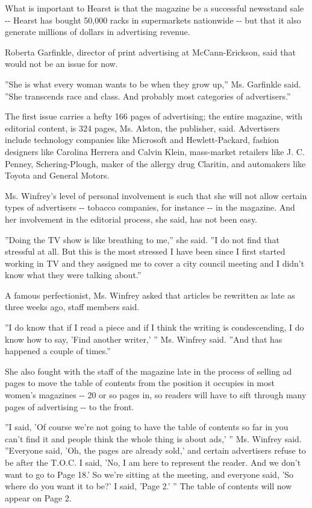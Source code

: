 What is important to Hearst is that the magazine be a successful
newsstand sale -\/- Hearst has bought 50,000 racks in supermarkets
nationwide -\/- but that it also generate millions of dollars in
advertising revenue.

Roberta Garfinkle, director of print advertising at McCann-Erickson,
said that would not be an issue for now.

''She is what every woman wants to be when they grow up,'' Ms. Garfinkle
said. ''She transcends race and class. And probably most categories of
advertisers.''

The first issue carries a hefty 166 pages of advertising; the entire
magazine, with editorial content, is 324 pages, Ms. Alston, the
publisher, said. Advertisers include technology companies like Microsoft
and Hewlett-Packard, fashion designers like Carolina Herrera and Calvin
Klein, mass-market retailers like J. C. Penney, Schering-Plough, maker
of the allergy drug Claritin, and automakers like Toyota and General
Motors.

Ms. Winfrey's level of personal involvement is such that she will not
allow certain types of advertisers -\/- tobacco companies, for instance
-\/- in the magazine. And her involvement in the editorial process, she
said, has not been easy.

''Doing the TV show is like breathing to me,'' she said. ''I do not find
that stressful at all. But this is the most stressed I have been since I
first started working in TV and they assigned me to cover a city council
meeting and I didn't know what they were talking about.''

A famous perfectionist, Ms. Winfrey asked that articles be rewritten as
late as three weeks ago, staff members said.

''I do know that if I read a piece and if I think the writing is
condescending, I do know how to say, 'Find another writer,' '' Ms.
Winfrey said. ''And that has happened a couple of times.''

She also fought with the staff of the magazine late in the process of
selling ad pages to move the table of contents from the position it
occupies in most women's magazines -\/- 20 or so pages in, so readers
will have to sift through many pages of advertising -\/- to the front.

''I said, 'Of course we're not going to have the table of contents so
far in you can't find it and people think the whole thing is about ads,'
'' Ms. Winfrey said. ''Everyone said, 'Oh, the pages are already sold,'
and certain advertisers refuse to be after the T.O.C. I said, 'No, I am
here to represent the reader. And we don't want to go to Page 18.' So
we're sitting at the meeting, and everyone said, 'So where do you want
it to be?' I said, 'Page 2.' '' The table of contents will now appear on
Page 2.

